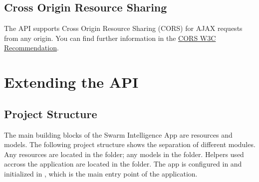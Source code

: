\documentclass[letterpaper,10pt,english]{sphinxmanual}
\begin{document}

\begin{sphinxVerbatim}[commandchars=\\\{\}]
  
 

\PYG{p}{[}
         
         
         
         
\PYG{p}{]}
\end{sphinxVerbatim}


\section{Cross Origin Resource Sharing}
\label{\detokenize{usage:cross-origin-resource-sharing}}
The API supports Cross Origin Resource Sharing (CORS) for AJAX requests from any origin. You can find further information in the \href{https://www.w3.org/TR/cors/}{CORS W3C Recommendation}.


\chapter{Extending the API}
\label{\detokenize{developers::doc}}\label{\detokenize{developers:extending-the-api}}

\section{Project Structure}
\label{\detokenize{developers:project-structure}}
The main building blocks of the Swarm Intelligence App are resources and models. The following project structure shows the separation of different modules. Any resources are located in the  folder; any models in the  folder. Helpers used accross the application are located in the  folder. The app is configured in  and initialized in , which is the main entry point of the application.
\end{document}
